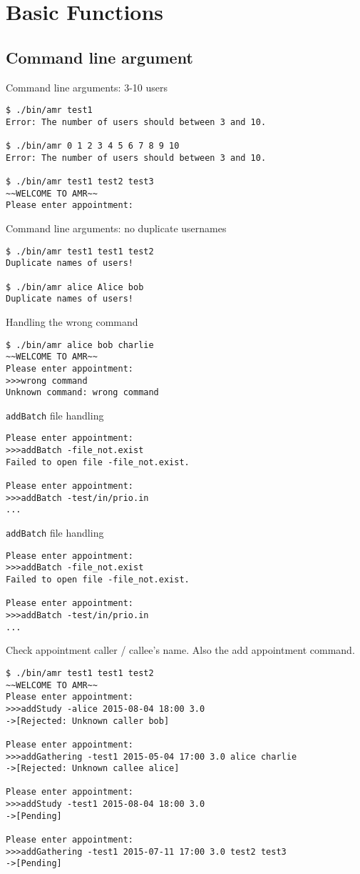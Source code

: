 \documentclass[12pt,a4paper]{report}
\begin{document}
\section{Basic Functions}
\subsection*{Command line argument}
Command line arguments: 3-10 users
\begin{lstlisting}
$ ./bin/amr test1
Error: The number of users should between 3 and 10.

$ ./bin/amr 0 1 2 3 4 5 6 7 8 9 10
Error: The number of users should between 3 and 10.

$ ./bin/amr test1 test2 test3
~~WELCOME TO AMR~~
Please enter appointment:
\end{lstlisting}

Command line arguments: no duplicate usernames
\begin{lstlisting}
$ ./bin/amr test1 test1 test2
Duplicate names of users!

$ ./bin/amr alice Alice bob
Duplicate names of users!
\end{lstlisting}

Handling the wrong command
\begin{lstlisting}
$ ./bin/amr alice bob charlie
~~WELCOME TO AMR~~
Please enter appointment:
>>>wrong command
Unknown command: wrong command
\end{lstlisting}

\texttt{addBatch} file handling
\begin{lstlisting}
Please enter appointment:
>>>addBatch -file_not.exist
Failed to open file -file_not.exist.

Please enter appointment:
>>>addBatch -test/in/prio.in
...
\end{lstlisting}

\texttt{addBatch} file handling
\begin{lstlisting}
Please enter appointment:
>>>addBatch -file_not.exist
Failed to open file -file_not.exist.

Please enter appointment:
>>>addBatch -test/in/prio.in
...
\end{lstlisting}
Check appointment caller / callee's name. Also the add appointment command.
\begin{lstlisting}
$ ./bin/amr test1 test1 test2
~~WELCOME TO AMR~~
Please enter appointment:
>>>addStudy -alice 2015-08-04 18:00 3.0
->[Rejected: Unknown caller bob]

Please enter appointment:
>>>addGathering -test1 2015-05-04 17:00 3.0 alice charlie
->[Rejected: Unknown callee alice]

Please enter appointment:
>>>addStudy -test1 2015-08-04 18:00 3.0
->[Pending]

Please enter appointment:
>>>addGathering -test1 2015-07-11 17:00 3.0 test2 test3
->[Pending]
\end{lstlisting}
\end{document}
